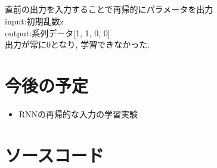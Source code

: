 \documentclass[twocolumn]{jarticle}     %
\begin{document}
\subsection{}
直前の出力を入力することで再帰的にパラメータを出力\\
input:初期乱数z\\
output:系列データ[1, 1, 0, 0]\\
出力が常に0となり, 学習できなかった.

\section{今後の予定}
\begin{itemize}
	\item {RNNの再帰的な入力の学習実験}
\end{itemize}


\section{ソースコード}




\end{document}
